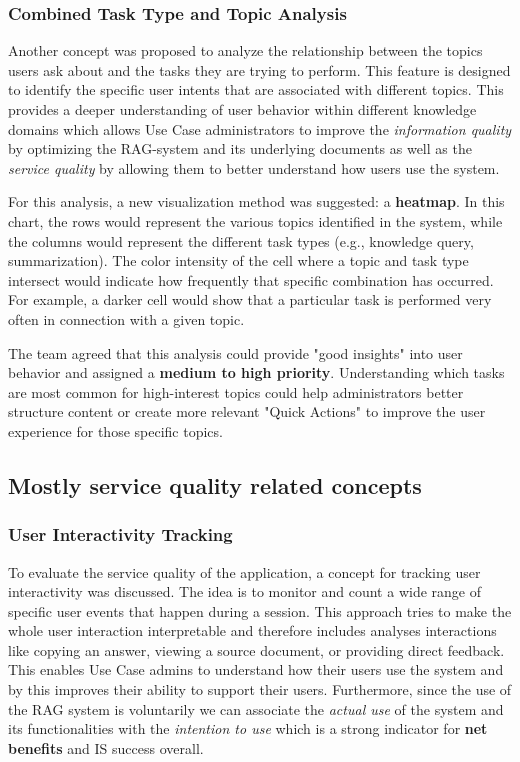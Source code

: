 \documentclass[
	english,
	ruledheaders=section,%
	class=report,%
	thesis={type=bachelor},%
	accentcolor=1b,%
	custommargins=true,%
	marginpar=false,%
	parskip=half-,%
	fontsize=11pt,%
	DIV=14,
]{tudapub}
\begin{document}
\subsubsection{Combined Task Type and Topic Analysis}
Another concept was proposed to analyze the relationship between the topics users ask about and the tasks they are trying to perform. This feature is designed to identify the specific user intents that are associated with different topics. This provides a deeper understanding of user behavior within different knowledge domains which allows Use Case administrators to improve the \textit{information quality} by optimizing the RAG-system and its underlying documents as well as the \textit{service quality} by allowing them to better understand how users use the system.

For this analysis, a new visualization method was suggested: a \textbf{heatmap}. In this chart, the rows would represent the various topics identified in the system, while the columns would represent the different task types (e.g., knowledge query, summarization). The color intensity of the cell where a topic and task type intersect would indicate how frequently that specific combination has occurred. For example, a darker cell would show that a particular task is performed very often in connection with a given topic.

The team agreed that this analysis could provide "good insights" into user behavior and assigned a \textbf{medium to high priority}. Understanding which tasks are most common for high-interest topics could help administrators better structure content or create more relevant "Quick Actions" to improve the user experience for those specific topics.
\subsection{Mostly service quality related concepts}
\subsubsection{User Interactivity Tracking}
To evaluate the service quality of the application, a concept for tracking user interactivity was discussed. The idea is to monitor and count a wide range of specific user events that happen during a session. This approach tries to make the whole user interaction interpretable and therefore includes analyses interactions like copying an answer, viewing a source document, or providing direct feedback. This enables Use Case admins to understand how their users use the system and by this improves their ability to support their users. Furthermore, since the use of the RAG system is voluntarily we can associate the \textit{actual use} of the system and its functionalities with the \textit{intention to use} which is a strong indicator for \textbf{net benefits} and IS success overall.
\end{document}
